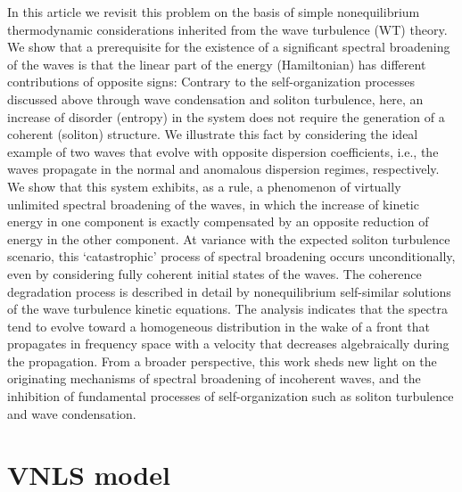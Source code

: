 \documentclass[pra,twocolumn,showpacs,preprintnumbers,amsmath,amssymb]{revtex4}
\begin{document}
In this article we revisit this problem on the basis of simple nonequilibrium thermodynamic considerations inherited from the wave turbulence (WT) theory.
We show that a prerequisite for the existence of a significant spectral broadening of the waves is that the linear part of the energy (Hamiltonian) has different contributions of opposite signs:
Contrary to the self-organization processes discussed above through wave condensation and soliton turbulence, here, an increase of disorder (entropy) in the system does not require the generation of a coherent (soliton) structure.
We illustrate this fact by considering the ideal example of two waves that evolve with opposite dispersion coefficients, i.e., the waves propagate in the normal and anomalous dispersion regimes, respectively.
We show that this system exhibits, as a rule, a phenomenon of virtually unlimited spectral broadening of the waves, in which the increase of kinetic energy in one component is exactly compensated by an opposite reduction of energy in the other component.
At variance with the expected soliton turbulence scenario, this `catastrophic' process of spectral broadening occurs unconditionally, even by considering fully coherent initial states of the waves.
The coherence degradation process is described in detail by nonequilibrium self-similar solutions of the wave turbulence kinetic equations. 
The analysis indicates that the spectra tend to evolve toward a homogeneous distribution in the wake of a front that propagates in frequency space with a velocity that decreases algebraically during the propagation.
From a broader perspective, this work  sheds new light on the originating mechanisms of spectral broadening of incoherent waves, and the inhibition of fundamental processes of self-organization such as soliton turbulence and wave condensation.



\section{VNLS model}
\end{document}
